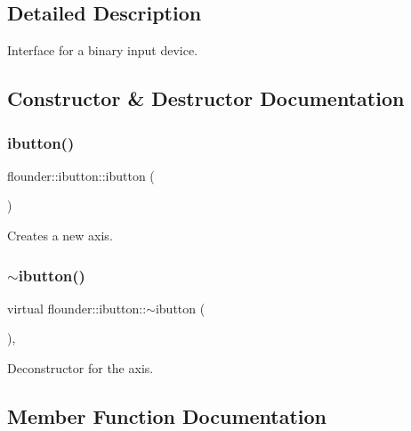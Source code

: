 \subsection{Detailed Description}
Interface for a binary input device. 



\subsection{Constructor \& Destructor Documentation}
\mbox{\label{classflounder_1_1ibutton_a76aa7e3a4cc57c267ef8380462e9c2b6}} 
\subsubsection{\texorpdfstring{ibutton()}{ibutton()}}
{\footnotesize\ttfamily flounder\+::ibutton\+::ibutton (\begin{DoxyParamCaption}{ }\end{DoxyParamCaption})\hspace{0.3cm}{\ttfamily [inline]}}



Creates a new axis. 

\mbox{\label{classflounder_1_1ibutton_aff254102cfa10ee61da7801c2027ac43}} 
\subsubsection{\texorpdfstring{$\sim$ibutton()}{~ibutton()}}
{\footnotesize\ttfamily virtual flounder\+::ibutton\+::$\sim$ibutton (\begin{DoxyParamCaption}{ }\end{DoxyParamCaption})\hspace{0.3cm}{\ttfamily [inline]}, {\ttfamily [virtual]}}



Deconstructor for the axis. 



\subsection{Member Function Documentation}
\mbox{\label{classflounder_1_1ibutton_af99b936d7329f74a27768ce6eb181327}} 

